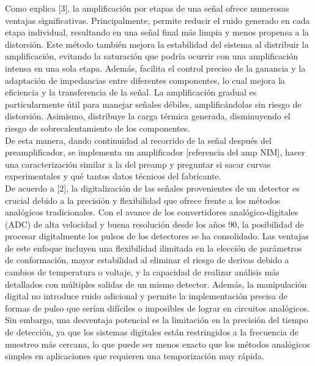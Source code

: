 \documentclass[]{book}
\begin{document}
\noindent Como explica [3], la amplificación por etapas de una señal ofrece numerosas ventajas significativas. Principalmente, permite reducir el ruido generado en cada etapa individual, resultando en una señal final más limpia y menos propensa a la distorsión. Este método también mejora la estabilidad del sistema al distribuir la amplificación, evitando la saturación que podría ocurrir con una amplificación intensa en una sola etapa. Además, facilita el control preciso de la ganancia y la adaptación de impedancias entre diferentes componentes, lo cual mejora la eficiencia y la transferencia de la señal. La amplificación gradual es particularmente útil para manejar señales débiles, amplificándolas sin riesgo de distorsión. Asimismo, distribuye la carga térmica generada, disminuyendo el riesgo de sobrecalentamiento de los componentes. \\


\noindent De esta manera, dando continuidad al recorrido de la señal después del preamplificador, se implementa un amplificador [referencia del amp NIM], hacer una caracterización similar a la del preamp y preguntar si sacar curvas experimentales y qué tantos datos técnicos del fabricante.\\

\noindent De acuerdo a [2], la digitalización de las señales provenientes de un detector es crucial debido a la precisión y flexibilidad que ofrece frente a los métodos analógicos tradicionales. Con el avance de los convertidores analógico-digitales (ADC) de alta velocidad y buena resolución desde los años 90, la posibilidad de procesar digitalmente los pulsos de los detectores se ha consolidado. Las ventajas de este enfoque incluyen una flexibilidad ilimitada en la elección de parámetros de conformación, mayor estabilidad al eliminar el riesgo de derivas debido a cambios de temperatura o voltaje, y la capacidad de realizar análisis más detallados con múltiples salidas de un mismo detector. Además, la manipulación digital no introduce ruido adicional y permite la implementación precisa de formas de pulso que serían difíciles o imposibles de lograr en circuitos analógicos. Sin embargo, una desventaja potencial es la limitación en la precisión del tiempo de detección, ya que los sistemas digitales están restringidos a la frecuencia de muestreo más cercana, lo que puede ser menos exacto que los métodos analógicos simples en aplicaciones que requieren una temporización muy rápida.\\
\end{document}
